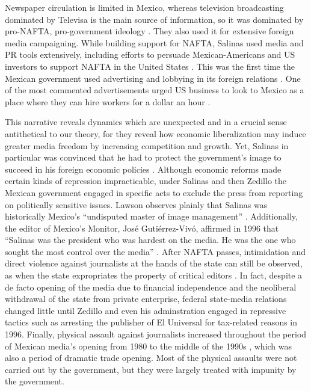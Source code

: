 \documentclass[12pt,a4paper]{article}\usepackage[]{graphicx}\usepackage[]{color}
\begin{document}
Newspaper circulation is limited in Mexico, whereas television broadcasting dominated by Televisa is the main source of information, so it was dominated by pro-NAFTA, pro-government ideology \parencite{Hellman:1993wa}. They also used it for extensive foreign media campaigning. While building support for NAFTA, Salinas used media and PR tools extensively, including efforts to persuade Mexican-Americans and US investors to support NAFTA in the United States \parencite{Morris:2001iy}. This was the first time the Mexican government used advertising and lobbying in its foreign relations \parencite{Chabat:1997wj}. One of the most commented advertisements urged US business to look to Mexico as a place where they can hire workers for a dollar an hour \parencites[105]{center1993trading}[45]{Chabat:1997wj}.

This narrative reveals dynamics which are unexpected and in a crucial sense antithetical to our theory, for they reveal how economic liberalization may induce greater media freedom by increasing competition and growth. Yet, Salinas in particular was convinced that he had to protect the government's image to succeed in his foreign economic policies \parencite[107]{Dominguez:2009wd}. Although economic reforms made certain kinds of repression impracticable, under Salinas and then Zedillo the Mexican government engaged in specific acts to exclude the press from reporting on politically sensitive issues. Lawson observes plainly that Salinas was historically Mexico's “undisputed master of image management” \parencite[39]{lawson2002building}. Additionally, the editor of Mexico's Monitor, José Gutiérrez-Vivó, affirmed in 1996 that “Salinas was the president who was hardest on the media. He was the one who sought the most control over the media” \parencite[39]{lawson2002building}. After NAFTA passes, intimidation and direct violence against journalists at the hands of the state can still be observed, as when the state expropriates the property of critical editors \parencite{OrmeJr:1997da}. In fact, despite a de facto opening of the media due to financial independence and the neoliberal withdrawal of the state from private enterprise, federal state-media relations changed little until Zedillo and even his adminstration engaged in repressive tactics such as arresting the publisher of El Universal for tax-related reasons in 1996. Finally, physical assault against journalists increased throughout the period of Mexican media's opening from 1980 to the middle of the 1990s \parencite[81]{lawson2002building}, which was also a period of dramatic trade opening. Most of the physical assaults were not carried out by the government, but they were largely treated with impunity by the government.
\end{document}
